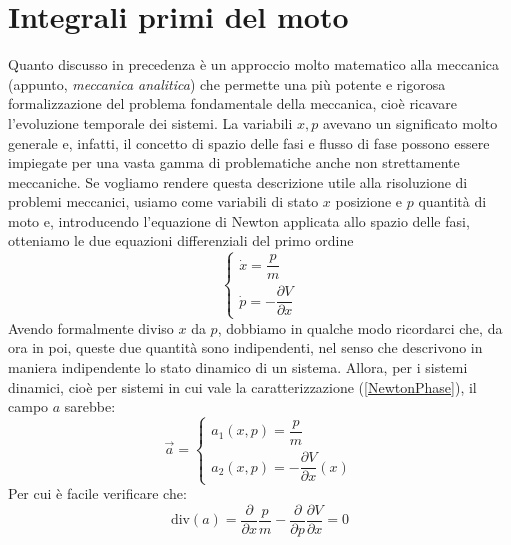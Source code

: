 \documentclass[a4paper,openany]{article}
\begin{document}
	\section{Integrali primi del moto}
	Quanto discusso in precedenza è un approccio molto matematico alla meccanica (appunto, \textit{meccanica analitica}) che permette una più potente e rigorosa formalizzazione del problema fondamentale della meccanica, cioè ricavare l'evoluzione temporale dei sistemi. La variabili $x,p$ avevano un significato molto generale e, infatti, il concetto di spazio delle fasi e flusso di fase possono essere impiegate per una vasta gamma di problematiche anche non strettamente meccaniche. Se vogliamo rendere questa descrizione utile alla risoluzione di problemi meccanici, usiamo come variabili di stato $x$ posizione e $p$ quantità di moto e, introducendo l'equazione di Newton applicata allo spazio delle fasi, otteniamo le due equazioni differenziali del primo ordine 
	\begin{equation}
		\begin{cases}
			\dot{x} = \dfrac{p}{m} \\
			\dot{p} = - \dfrac{\partial V}{\partial x}
		\end{cases}
		\label{NewtonPhase}
	\end{equation}
	Avendo formalmente diviso $x$ da $p$, dobbiamo in qualche modo ricordarci che, da ora in poi, queste due quantità sono indipendenti, nel senso che descrivono in maniera indipendente lo stato dinamico di un sistema.
	Allora, per i sistemi dinamici, cioè per sistemi in cui vale la caratterizzazione (\ref{NewtonPhase}), il campo $a$ sarebbe:
	\begin{equation}
		\vec{a} =
		\begin{cases}
			a_{1}(x,p) = \dfrac{p}{m} \\
			a_{2}(x,p) =  -\dfrac{\partial V}{\partial x}(x)
		\end{cases}
		\label{NewtonField}
	\end{equation}
	Per cui è facile verificare che:
	$$
	\mbox{div}(a) = \dfrac{\partial}{\partial x}\dfrac{p}{m} - \dfrac{\partial }{\partial p} \dfrac{\partial V}{\partial x} = 0
	$$
\end{document}
